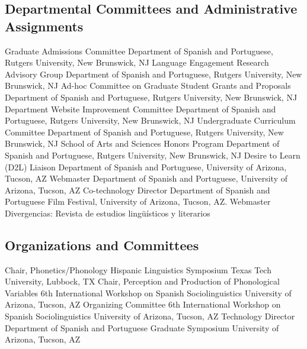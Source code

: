 \documentclass[11pt,letterpaper]{assets/tex/moderncv}
\begin{document}
\subsection{Departmental Committees and Administrative Assignments}

        {Graduate Admissions Committee}
        {}
        {}
        {}
        {Department of Spanish and Portuguese, Rutgers University, New Brunswick, NJ}
        {Language Engagement Research Advisory Group}
        {}
        {}
        {}
        {Department of Spanish and Portuguese, Rutgers University, New Brunswick, NJ}
        {Ad-hoc Committee on Graduate Student Grants and Proposals}
        {}
        {}
        {}
        {Department of Spanish and Portuguese, Rutgers University, New Brunswick, NJ}
        {Department Website Improvement Committee}
        {}
        {}
        {}
        {Department of Spanish and Portuguese, Rutgers University, New Brunswick, NJ}
        {Undergraduate Curriculum Committee}
        {}
        {}
        {}
        {Department of Spanish and Portuguese, Rutgers University, New Brunswick, NJ}
        {School of Arts and Sciences Honors Program}
        {}
        {}
        {}
        {Department of Spanish and Portuguese, Rutgers University, New Brunswick, NJ}
        {Desire to Learn (D2L) Liaison}
        {}
        {}
        {}
        {Department of Spanish and Portuguese, University of Arizona, Tucson, AZ}
        {Webmaster}
        {}
        {}
        {}
        {Department of Spanish and Portuguese, University of Arizona, Tucson, AZ}
        {Co-technology Director}
        {}
        {}
        {}
        {Department of Spanish and Portuguese Film Festival, University of Arizona, Tucson, AZ.}
        {Webmaster}
        {Divergencias: Revista de estudios ling\"u\'isticos y literarios}
        {}
        {}
        {}

\subsection{Organizations and Committees}

        {Chair, Phonetics/Phonology}
        {Hispanic Linguistics Symposium}
        {}
        {}
        {Texas Tech University, Lubbock, TX}
        {Chair, Perception and Production of Phonological Variables}
        {6th International Workshop on Spanish Sociolinguistics}
        {}
        {}
        {University of Arizona, Tucson, AZ}
        {Organizing Committee}
        {6th International Workshop on Spanish Sociolinguistics}
        {}
        {}
        {University of Arizona, Tucson, AZ}
        {Technology Director}
        {Department of Spanish and Portuguese Graduate Symposium}
        {}
        {}
        {University of Arizona, Tucson, AZ}
\end{document}
